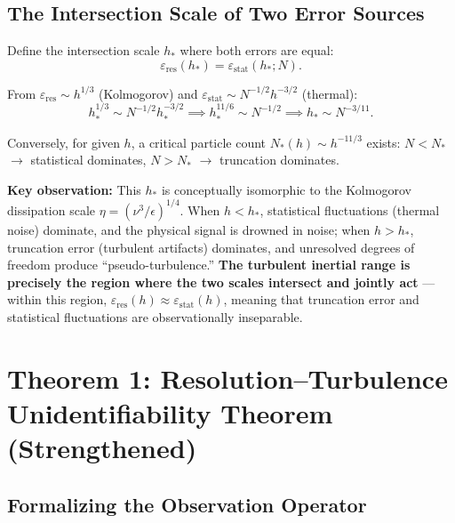 \documentclass[11pt,a4paper]{article}
\theoremstyle{definition}
\theoremstyle{remark}
\newcommand{\epsRes}{\varepsilon_{\text{res}}}
\newcommand{\epsStat}{\varepsilon_{\text{stat}}}
\newcommand{\Kolmogorov}{\eta}
\begin{document}
\subsection{The Intersection Scale of Two Error Sources}

Define the intersection scale $h_*$ where both errors are equal:
\begin{equation}\label{eq:h_star_def}
  \epsRes(h_*) = \epsStat(h_*; N).
\end{equation}

From $\epsRes \sim h^{1/3}$ (Kolmogorov) and $\epsStat \sim N^{-1/2} h^{-3/2}$ (thermal):
\begin{equation}\label{eq:h_star_value}
  h_*^{1/3} \sim N^{-1/2} h_*^{-3/2}
  \implies h_*^{11/6} \sim N^{-1/2}
  \implies h_* \sim N^{-3/11}.
\end{equation}

Conversely, for given $h$, a critical particle count $N_*(h) \sim h^{-11/3}$ exists: $N < N_*$ $\to$ statistical dominates, $N > N_*$ $\to$ truncation dominates.

\textbf{Key observation:} This $h_*$ is conceptually isomorphic to the Kolmogorov dissipation scale $\Kolmogorov = (\nu^3/\epsilon)^{1/4}$. When $h < h_*$, statistical fluctuations (thermal noise) dominate, and the physical signal is drowned in noise; when $h > h_*$, truncation error (turbulent artifacts) dominates, and unresolved degrees of freedom produce ``pseudo-turbulence.'' \textbf{The turbulent inertial range is precisely the region where the two scales intersect and jointly act} --- within this region, $\epsRes(h) \approx \epsStat(h)$, meaning that truncation error and statistical fluctuations are observationally inseparable.

\section{Theorem 1: Resolution--Turbulence Unidentifiability Theorem (Strengthened)}

\subsection{Formalizing the Observation Operator}
\end{document}
